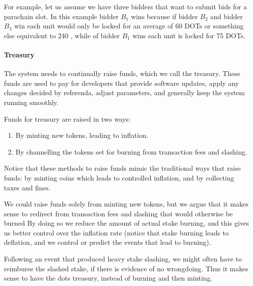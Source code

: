 For example, let us assume we have three bidders that want to submit bids for a parachain slot.
In this example bidder $B_1$ wins because if bidder $B_2$ and bidder $B_3$ win each unit would only be locked for an average of 60 DOTs or something else equivalent to 240 , while of bidder $B_1$ wins each unit is locked for 75 DOTs.

 \paragraph{Treasury\eray{}{:}}

 The system needs to continually raise funds, which we call the treasury.
 These funds are used to pay for developers that provide software updates, apply any changes decided by referenda, adjust parameters, and generally keep the system running smoothly.

Funds for treasury are raised in two ways:

{
\begin{enumerate}
\item By minting new tokens, leading to inflation.
\item By channelling the tokens set for burning from transaction fees and slashing.
\end{enumerate}
}

 
Notice that these methods to raise funds mimic the traditional ways that  raise funds: by minting coins which leads to controlled inflation, and by collecting taxes and fines.

We could raise funds solely from minting new tokens, but we argue that it makes sense to redirect  from transaction fees and slashing that would otherwise be burned
By doing so\eray{}{,} we reduce the amount of actual stake burning, and this gives us better control over the inflation rate (notice that stake burning leads to deflation, and we  control or predict the events that lead to burning).

Following an event that produced heavy stake slashing, we might often have to reimburse the slashed stake, if there is evidence of no wrongdoing. Thus\eray{}{,} it makes sense to have the dots  treasury, instead of burning and then minting.

